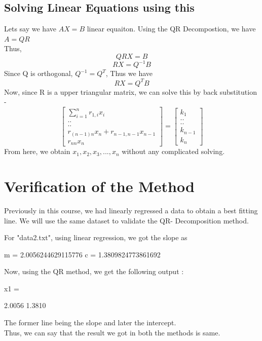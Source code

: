 \documentclass[12pt]{article}
\begin{document}
\subsection{Solving Linear Equations using this}
Lets say we have $AX=B$ linear equaiton. Using the QR Decompostion, we have $A=QR$\\
Thus, 
\begin{equation*}
    QRX=B
\end{equation*}
\begin{equation*}
    RX=Q^{-1}B
\end{equation*}
Since Q is orthogonal, $Q^{-1} = Q^T$, Thus we have
\begin{equation*}
    RX=Q^TB
\end{equation*}
Now, since R is a upper triangular matrix, we can solve this by back substitution -
\begin{equation*}
    \left[\begin{array}{c}
\sum_{i=1}^{n} r_{1, i} x_{i} \\
. . \\
. . \\
r_{(n-1) n} x_{n}+r_{n-1, n-1} x_{n-1} \\
r_{n n} x_{n}
\end{array}\right]=\left[\begin{array}{c}
k_{1} \\
. . \\
. . \\
k_{n-1} \\
k_{n}
\end{array}\right]
\end{equation*}
From here,  we obtain $x_1,x_2,x_3,...,x_n$ without any complicated solving.
\newpage

\section{Verification of the Method}
Previously in this course, we had linearly regressed a data to obtain a best fitting line. We will use the same dataset to validate the QR- Decomposition method.

For "data2.txt", using linear regression, we got the slope as
\begin{python}
m = 2.0056244629115776
c = 1.3809824773861692
\end{python}
Now, using the QR method,  we get the following output :
\begin{python}
x1 =

   2.0056
   1.3810
\end{python}
The former line being the slope and later the intercept.\\
Thus, we can say that the result we got in both the methods is same.
\end{document}
